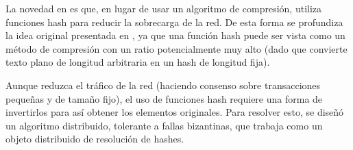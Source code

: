 La novedad en \hashchain es que, en lugar de usar un algoritmo de compresión, utiliza funciones hash
para reducir la sobrecarga de la red.
De esta forma se profundiza la idea original presentada en \compresschain, ya que una función hash
puede ser vista como un método de compresión con un ratio potencialmente muy alto (dado que convierte
texto plano de longitud arbitraria en un hash de longitud fija).

Aunque reduzca el tráfico de la red (haciendo consenso sobre transacciones pequeñas
y de tamaño fijo), el uso de funciones hash requiere una forma de
invertirlos para así obtener los elementos originales.
Para resolver esto, se diseñó
un algoritmo distribuido, tolerante a fallas bizantinas, que trabaja como un objeto
distribuido de resolución de hashes.




